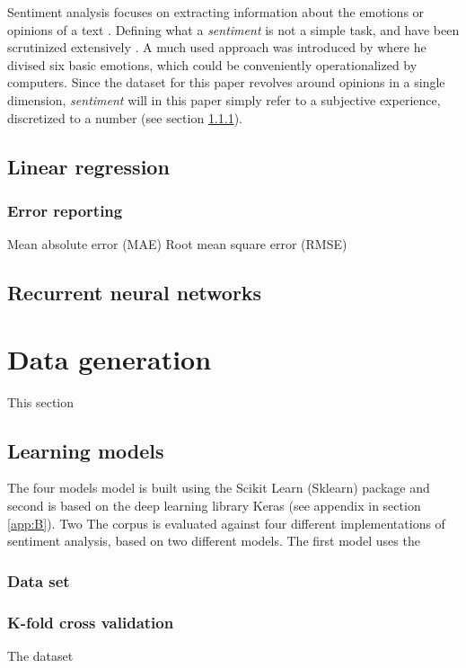 \documentclass[a4paper]{article}
\begin{document}
Sentiment analysis focuses on extracting information about the emotions or
opinions of a text \citep{PangLee2008}.
Defining what a \textit{sentiment} is not a simple task, and have been
scrutinized extensively \citep{Jurafsky2000, PangLee2008}.
A much used approach was introduced by \cite{Ekman92} where he divised six
basic emotions, which could be conveniently operationalized by computers.
Since the dataset for this paper revolves around opinions in a single dimension,
\textit{sentiment} will in this paper simply refer to a subjective experience,
discretized to a number (see section \ref{sec:dataset}).


\subsection{Linear regression}


\subsubsection{Error reporting}
Mean absolute error (MAE)
Root mean square error (RMSE)

\subsection{Recurrent neural networks}

\section{Data generation}
This section

\subsection{Learning models}
The four models model is built using the Scikit Learn (Sklearn) package and second
is based on the deep learning library Keras (see appendix in section \ref{app:B}).
Two The corpus is evaluated against four different implementations of
sentiment analysis, based on two different models. The first model uses the

\subsubsection{Data set}
\label{sec:dataset}

\subsubsection{K-fold cross validation}
The dataset
\end{document}
